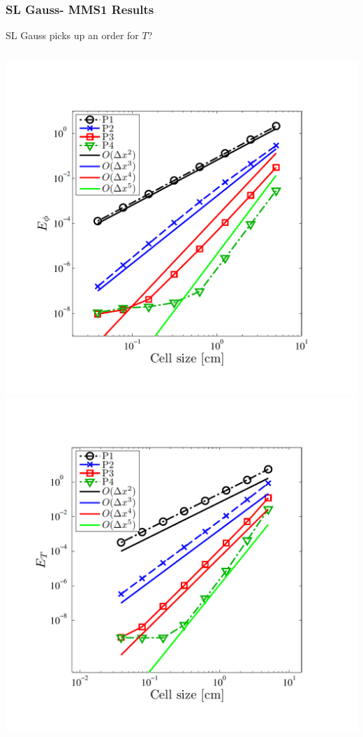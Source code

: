 \documentclass{beamer}
\begin{document}
\begin{frame}
\frametitle{SL Gauss- MMS1 Results}
SL Gauss picks up an order for $T$?
\begin{columns}[t]
\centering
\includegraphics[width=\textwidth,trim=0.25in  0.2in 0.75in 0.5in,clip=true]{../chapter6_grey_radtran/Dissertation_Data/MMS2_SLXS_Gauss_phi_L2.pdf}
\centering
\includegraphics[width=\textwidth,trim=0.25in  0.2in 0.75in 0.5in,clip=true]{../chapter6_grey_radtran/Dissertation_Data/MMS2_SLXS_Gauss_temp_L2.pdf}
\end{columns}
\end{frame}
\end{document}
